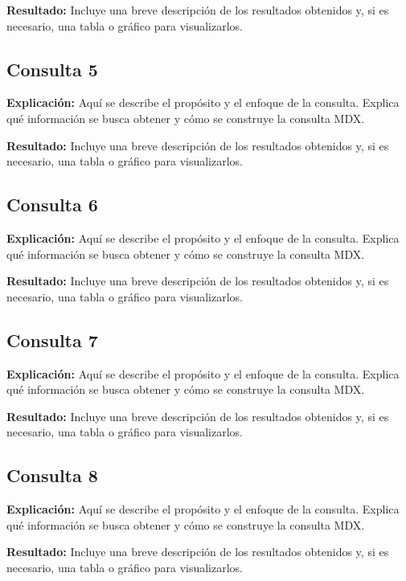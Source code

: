 \documentclass{article}
\begin{document}
\textbf{Resultado:}  
Incluye una breve descripción de los resultados obtenidos y, si es necesario, una tabla o gráfico para visualizarlos.

\subsection{Consulta 5}

\textbf{Explicación:}  
Aquí se describe el propósito y el enfoque de la consulta. Explica qué información se busca obtener y cómo se construye la consulta MDX.

\textbf{Resultado:}  
Incluye una breve descripción de los resultados obtenidos y, si es necesario, una tabla o gráfico para visualizarlos.

\subsection{Consulta 6}

\textbf{Explicación:}  
Aquí se describe el propósito y el enfoque de la consulta. Explica qué información se busca obtener y cómo se construye la consulta MDX.

\textbf{Resultado:}  
Incluye una breve descripción de los resultados obtenidos y, si es necesario, una tabla o gráfico para visualizarlos.

\subsection{Consulta 7}

\textbf{Explicación:}  
Aquí se describe el propósito y el enfoque de la consulta. Explica qué información se busca obtener y cómo se construye la consulta MDX.

\textbf{Resultado:}  
Incluye una breve descripción de los resultados obtenidos y, si es necesario, una tabla o gráfico para visualizarlos.

\subsection{Consulta 8}

\textbf{Explicación:}  
Aquí se describe el propósito y el enfoque de la consulta. Explica qué información se busca obtener y cómo se construye la consulta MDX.

\textbf{Resultado:}  
Incluye una breve descripción de los resultados obtenidos y, si es necesario, una tabla o gráfico para visualizarlos.
\end{document}
